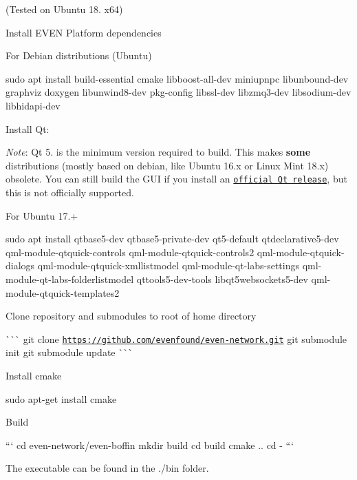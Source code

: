 (Tested on Ubuntu 18. x64)


\begin{DoxyEnumerate}
\item Install E\+V\+EN Platform dependencies
\begin{DoxyItemize}
\item For Debian distributions (Ubuntu)

{\ttfamily sudo apt install build-\/essential cmake libboost-\/all-\/dev miniupnpc libunbound-\/dev graphviz doxygen libunwind8-\/dev pkg-\/config libssl-\/dev libzmq3-\/dev libsodium-\/dev libhidapi-\/dev}
\end{DoxyItemize}
\item Install Qt\+:

{\itshape Note}\+: Qt 5. is the minimum version required to build. This makes {\bfseries some} distributions (mostly based on debian, like Ubuntu 16.\+x or Linux Mint 18.\+x) obsolete. You can still build the G\+UI if you install an \href{https://wiki.qt.io/Install_Qt_5_on_Ubuntu}{\tt official Qt release}, but this is not officially supported.
\begin{DoxyItemize}
\item For Ubuntu 17.+

{\ttfamily sudo apt install qtbase5-\/dev qtbase5-\/private-\/dev qt5-\/default qtdeclarative5-\/dev qml-\/module-\/qtquick-\/controls qml-\/module-\/qtquick-\/controls2 qml-\/module-\/qtquick-\/dialogs qml-\/module-\/qtquick-\/xmllistmodel qml-\/module-\/qt-\/labs-\/settings qml-\/module-\/qt-\/labs-\/folderlistmodel qttools5-\/dev-\/tools libqt5websockets5-\/dev qml-\/module-\/qtquick-\/templates2}
\end{DoxyItemize}
\item Clone repository and submodules to root of home directory

\`{}\`{}\`{} git clone \href{https://github.com/evenfound/even-network.git}{\tt https\+://github.\+com/evenfound/even-\/network.\+git} git submodule init git submodule update \`{}\`{}\`{}
\item Install cmake

{\ttfamily sudo apt-\/get install cmake}
\item Build
\end{DoxyEnumerate}

\begin{DoxyVerb}```
cd even-network/even-boffin
mkdir build
cd build
cmake ..
cd -
```
\end{DoxyVerb}


The executable can be found in the ./bin folder.

